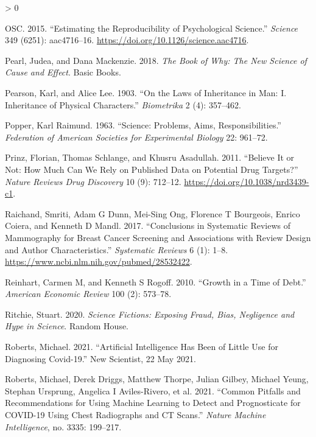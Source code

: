 \documentclass[
  10pt,
  b5paper]{book}
\newlength{\cslhangindent}
\newenvironment{CSLReferences}[2] %
 {%
  \setlength{\parindent}{0pt}
  \ifodd #1 \everypar{\setlength{\hangindent}{\cslhangindent}}\ignorespaces\fi
  \ifnum #2 > 0
  \setlength{\parskip}{#2\baselineskip}
  \fi
 }%
 {}
\begin{document}
\begin{CSLReferences}{1}{0}
\leavevmode\hypertarget{ref-osc_EstRep2015}{}%
OSC. 2015. {``Estimating the Reproducibility of Psychological Science.''} \emph{Science} 349 (6251): aac4716--16. \url{https://doi.org/10.1126/science.aac4716}.

\leavevmode\hypertarget{ref-pearl2018book}{}%
Pearl, Judea, and Dana Mackenzie. 2018. \emph{The Book of Why: The New Science of Cause and Effect}. Basic Books.

\leavevmode\hypertarget{ref-pearson1903laws}{}%
Pearson, Karl, and Alice Lee. 1903. {``On the Laws of Inheritance in Man: I. Inheritance of Physical Characters.''} \emph{Biometrika} 2 (4): 357--462.

\leavevmode\hypertarget{ref-popper_1963}{}%
Popper, Karl Raimund. 1963. {``Science: Problems, Aims, Responsibilities.''} \emph{Federation of American Societies for Experimental Biology} 22: 961--72.

\leavevmode\hypertarget{ref-r9_prinz_schlange_asadullah_2011}{}%
Prinz, Florian, Thomas Schlange, and Khusru Asadullah. 2011. {``Believe It or Not: How Much Can We Rely on Published Data on Potential Drug Targets?''} \emph{Nature Reviews Drug Discovery} 10 (9): 712--12. \url{https://doi.org/10.1038/nrd3439-c1}.

\leavevmode\hypertarget{ref-raichand2017conclusions}{}%
Raichand, Smriti, Adam G Dunn, Mei-Sing Ong, Florence T Bourgeois, Enrico Coiera, and Kenneth D Mandl. 2017. {``Conclusions in Systematic Reviews of Mammography for Breast Cancer Screening and Associations with Review Design and Author Characteristics.''} \emph{Systematic Reviews} 6 (1): 1--8. \url{https://www.ncbi.nlm.nih.gov/pubmed/28532422}.

\leavevmode\hypertarget{ref-reinhart2010growth}{}%
Reinhart, Carmen M, and Kenneth S Rogoff. 2010. {``Growth in a Time of Debt.''} \emph{American Economic Review} 100 (2): 573--78.

\leavevmode\hypertarget{ref-ritchie2020science}{}%
Ritchie, Stuart. 2020. \emph{Science Fictions: Exposing Fraud, Bias, Negligence and Hype in Science}. Random House.

\leavevmode\hypertarget{ref-roberts2021AIcovid19}{}%
Roberts, Michael. 2021. {``Artificial Intelligence Has Been of Little Use for Diagnosing Covid-19.''} New Scientist, 22 May 2021.

\leavevmode\hypertarget{ref-roberts2021common}{}%
Roberts, Michael, Derek Driggs, Matthew Thorpe, Julian Gilbey, Michael Yeung, Stephan Ursprung, Angelica I Aviles-Rivero, et al. 2021. {``Common Pitfalls and Recommendations for Using Machine Learning to Detect and Prognosticate for COVID-19 Using Chest Radiographs and CT Scans.''} \emph{Nature Machine Intelligence}, no. 3335: 199--217.


\end{CSLReferences}
\end{document}

